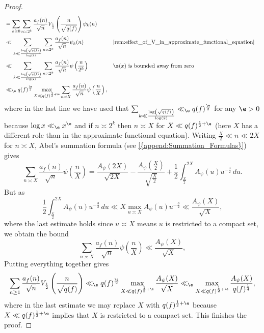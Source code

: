 \begin{proof}
\begin{align*}
         &= \sum_{k \ge 0}\sum_{n \asymp 2^{k}}\frac{a_{f}(n)}{\sqrt{n}}V_{\frac{1}{2}}\left(\frac{n}{\sqrt{q(f)}}\right)\psi_{k}(n) \\
        &\ll \sum_{k \ll \frac{\log\left(\sqrt{q(f)}\right)}{\log(2)}}\sum_{n \asymp 2^{k}}\frac{a_{f}(n)}{\sqrt{n}}\psi_{k}(n) && \text{\cref{rem:effect_of_V_in_approximate_functional_equation}} \\
        &\ll \sum_{k \ll \frac{\log\left(\sqrt{q(f)}\right)}{\log(2)}}\sum_{n \asymp 2^{k}}\frac{a_{f}(n)}{\sqrt{n}}\psi\left(\frac{n}{2^{k}}\right) && \text{$\s(x)$ is bounded away from zero} \\
        &\ll_{\e} q(f)^{\frac{\e}{2}}\max_{X \ll q(f)^{\frac{1}{2}+\e}}\sum_{n \asymp X}\frac{a_{f}(n)}{\sqrt{n}}\psi\left(\frac{n}{X}\right),
      \end{align*}
      where in the last line we have used that $\sum_{k \ll \frac{\log\left(\sqrt{q(f)}\right)}{\log(2)}} \ll_{\e} q(f)^{\frac{\e}{2}}$ for any $\e > 0$ because $\log{x} \ll_{\e} x^{\e}$ and if $n \asymp 2^{k}$ then $n \asymp X$ for $X \ll q(f)^{\frac{1}{2}+\e}$ (here $X$ has a different role than in the approximate functional equation). Writing $\frac{X}{2} \ll n \ll 2X$ for $n \asymp X$, Abel's summation formula (see \cref{{append:Summation_Formulas}}) gives
      \[
        \sum_{n \asymp X}\frac{a_{f}(n)}{\sqrt{n}}\psi\left(\frac{n}{X}\right) = \frac{A_{\psi}(2X)}{\sqrt{2X}}-\frac{A_{\psi}\left(\frac{X}{2}\right)}{\sqrt{\frac{X}{2}}}+\frac{1}{2}\int_{\frac{X}{2}}^{2X}A_{\psi}(u)u^{-\frac{3}{2}}\,du.
      \]
      But as
      \[
        \frac{1}{2}\int_{\frac{X}{2}}^{2X}A_{\psi}(u)u^{-\frac{3}{2}}\,du \ll X\max_{u \asymp X}A_{\psi}(u)u^{-\frac{3}{2}} \ll \frac{A_{\psi}(X)}{\sqrt{X}},
      \]
      where the last estimate holds since $u \asymp X$ means $u$ is restricted to a compact set, we obtain the bound
      \[
        \sum_{n \asymp X}\frac{a_{f}(n)}{\sqrt{n}}\psi\left(\frac{n}{X}\right) \ll \frac{A_{\psi}(X)}{\sqrt{X}},
      \]
      Putting everything together gives
      \[
        \sum_{n \ge 1}\frac{a_{f}(n)}{\sqrt{n}}V_{\frac{1}{2}}\left(\frac{n}{\sqrt{q(f)}}\right) \ll_{\e} q(f)^{\frac{\e}{2}}\max_{X \ll q(f)^{\frac{1}{2}+\e}}\frac{A_{\psi}(X)}{\sqrt{X}} \ll_{\e} \max_{X \ll q(f)^{\frac{1}{2}+\e}}\frac{A_{\psi}(X)}{q(f)^{\frac{1}{4}}},
      \]
      where in the last estimate we may replace $X$ with $q(f)^{\frac{1}{2}+\e}$ because $X \ll q(f)^{\frac{1}{2}+\e}$ implies that $X$ is restricted to a compact set. This finishes the proof.
    \end{proof}